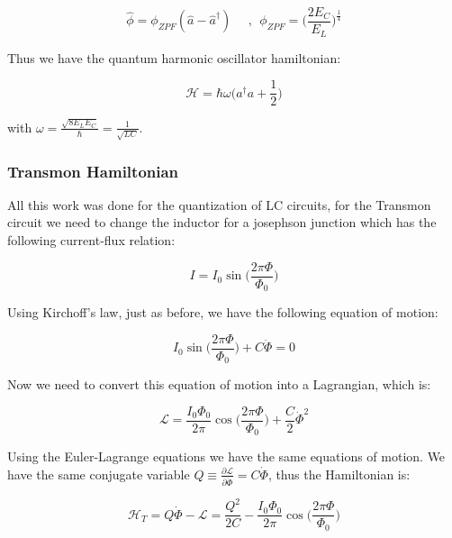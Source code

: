 \begin{equation}
    \hat \phi =  \phi_{ZPF} ( \hat a - \hat a^\dagger) \ \ \ \ \ \ , \ \ \phi_{ZPF} = \bigg( \frac{2 E_C}{E_L} \bigg)^{\frac{1}{4}}
\end{equation}

Thus we have the quantum harmonic oscillator hamiltonian:

\begin{equation}
    \mathcal{H} = \hbar \omega \bigg( a^\dagger a + \frac{1}{2} \bigg)
\end{equation}

with $\omega = \frac{\sqrt{8E_L E_C}}{\hbar} = \frac{1}{\sqrt{LC}}$.

\subsubsection{Transmon Hamiltonian}
\label{Subsubsec: Transmon Hamiltonian}

All this work was done for the quantization of LC circuits, for the Transmon circuit we need to change the inductor for a josephson junction which has the following current-flux relation:

\begin{equation}
    I = I_0 \sin \bigg( \frac{2\pi \Phi}{\Phi_0} \bigg)
\end{equation}

Using Kirchoff's law, just as before, we have the following equation of motion:

\begin{equation}
    I_0 \sin \bigg( \frac{2\pi \Phi}{\Phi_0} \bigg) + C \ddot{\Phi} = 0
\end{equation}

Now we need to convert this equation of motion into a Lagrangian, which is:

\begin{equation}
    \mathcal{L} = \frac{I_0 \Phi_0}{2\pi} \cos \bigg( \frac{2\pi \Phi}{\Phi_0} \bigg) + \frac{C}{2} \dot{\Phi}^2
\end{equation}

Using the Euler-Lagrange equations we have the same equations of motion. We have the same conjugate variable $Q \equiv \frac{\partial \mathcal{L}}{\partial \dot{\Phi}} = C \dot{\Phi}$, thus the Hamiltonian is:

\begin{equation}
    \mathcal{H}_T = Q \dot{\Phi} - \mathcal{L} = \frac{Q^2}{2C} - \frac{I_0 \Phi_0}{2 \pi} \cos \bigg( \frac{2 \pi \Phi}{\Phi_0} \bigg)
\end{equation}


